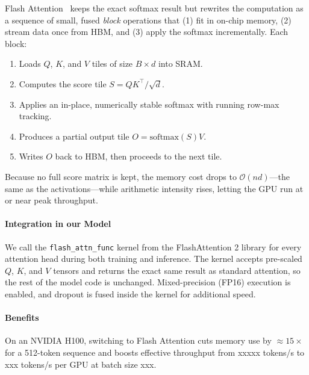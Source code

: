 Flash Attention~\cite{dao2022flashattentionfastmemoryefficientexact} keeps the exact softmax result but rewrites the computation as a sequence of small, fused \emph{block} operations that (1) fit in on-chip memory, (2) stream data once from HBM, and (3) apply the softmax incrementally.  Each block:

\begin{enumerate}
  \item Loads $Q$, $K$, and $V$ tiles of size $B \times d$ into SRAM.
  \item Computes the score tile $S = QK^{\top} / \sqrt{d}$.
  \item Applies an in-place, numerically stable softmax with running row-max tracking.
  \item Produces a partial output tile $O = \mathrm{softmax}(S) V$.
  \item Writes $O$ back to HBM, then proceeds to the next tile.
\end{enumerate}

Because no full score matrix is kept, the memory cost drops to
$\mathcal{O}(n d)$—the same as the activations—while arithmetic
intensity rises, letting the GPU run at or near peak throughput.

\paragraph{Integration in our Model}  
We call the \texttt{flash\_attn\_func} kernel from the FlashAttention 2 library for every attention head during both training and inference. The kernel accepts pre-scaled $Q$, $K$, and $V$ tensors and returns the exact same result as standard attention, so the rest of the model code is unchanged.  Mixed-precision (FP16) execution is enabled, and dropout is fused inside the kernel for additional speed.

\paragraph{Benefits}
On an NVIDIA H100, switching to Flash Attention cuts memory
use by $\approx\! 15\times$ for a 512-token sequence and boosts effective throughput from xxxxx tokens/s to xxx tokens/s per GPU at batch size xxx.